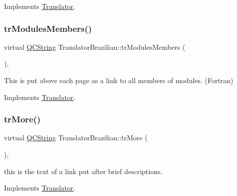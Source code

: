 Implements \mbox{\hyperlink{class_translator}{Translator}}.

\mbox{\label{class_translator_brazilian_aa5849f3fac2d8b02665ea094699696ce}} 
\subsubsection{\texorpdfstring{trModulesMembers()}{trModulesMembers()}}
{\footnotesize\ttfamily virtual \mbox{\hyperlink{class_q_c_string}{Q\+C\+String}} Translator\+Brazilian\+::tr\+Modules\+Members (\begin{DoxyParamCaption}{ }\end{DoxyParamCaption})\hspace{0.3cm}{\ttfamily [inline]}, {\ttfamily [virtual]}}

This is put above each page as a link to all members of modules. (Fortran) 

Implements \mbox{\hyperlink{class_translator}{Translator}}.

\mbox{\label{class_translator_brazilian_a163e73d491993802d5318f7493adef73}} 
\subsubsection{\texorpdfstring{trMore()}{trMore()}}
{\footnotesize\ttfamily virtual \mbox{\hyperlink{class_q_c_string}{Q\+C\+String}} Translator\+Brazilian\+::tr\+More (\begin{DoxyParamCaption}{ }\end{DoxyParamCaption})\hspace{0.3cm}{\ttfamily [inline]}, {\ttfamily [virtual]}}

this is the text of a link put after brief descriptions. 

Implements \mbox{\hyperlink{class_translator}{Translator}}.

\mbox{\label{class_translator_brazilian_a566f09b6ab8c64aadae9109968a0bae5}} 
